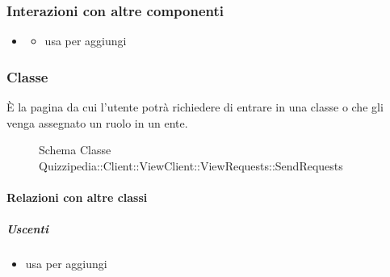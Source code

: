 \subsubsection{Interazioni con altre componenti}
\begin{itemize}
\item {}
\begin{itemize}
\item usa  per aggiungi
\end{itemize}
\end{itemize}
\subsubsection{Classe }
È la pagina da cui l'utente potrà richiedere di entrare in una classe o che gli venga assegnato un ruolo in un ente.
\begin{figure}[H]
\centering
\noindent{}
\caption[Schema Classe SendRequests]{Schema Classe Quizzipedia::Client::ViewClient::ViewRequests::SendRequests}
\end{figure}
\paragraph{Relazioni con altre classi}
\subparagraph{Uscenti}
\begin{itemize}
\item usa  per aggiungi
\end{itemize}
